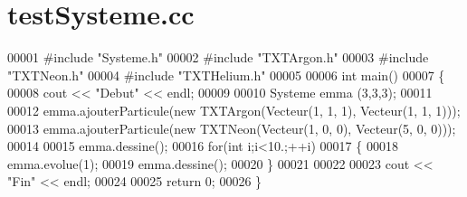 \section{test\+Systeme.\+cc}
\label{test_systeme_8cc_source}

\begin{DoxyCode}
00001 \textcolor{preprocessor}{#include "Systeme.h"}
00002 \textcolor{preprocessor}{#include "TXTArgon.h"}
00003 \textcolor{preprocessor}{#include "TXTNeon.h"}
00004 \textcolor{preprocessor}{#include "TXTHelium.h"}
00005 
00006 \textcolor{keywordtype}{int} main()
00007 \{
00008     cout << \textcolor{stringliteral}{"Debut"} << endl;
00009     
00010     Systeme emma (3,3,3);
00011     
00012     emma.ajouterParticule(\textcolor{keyword}{new} TXTArgon(Vecteur(1, 1, 1), Vecteur(1, 1, 1)));
00013     emma.ajouterParticule(\textcolor{keyword}{new} TXTNeon(Vecteur(1, 0, 0), Vecteur(5, 0, 0)));
00014     
00015     emma.dessine();
00016     \textcolor{keywordflow}{for}(\textcolor{keywordtype}{int} i;i<10.;++i)
00017     \{
00018         emma.evolue(1);
00019         emma.dessine();
00020     \}
00021 
00022     
00023     cout << \textcolor{stringliteral}{"Fin"} << endl;
00024     
00025     \textcolor{keywordflow}{return} 0;
00026 \}
\end{DoxyCode}
